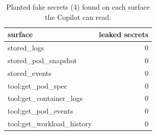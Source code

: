 \begin{table}[t]
\centering\small
\caption{Planted fake secrets (4) found on each surface the Copilot can read.}\label{tab:rq4_redaction}
\begin{tabular}{lr}
\toprule
surface & leaked secrets \\
\midrule
stored\_logs & 0 \\
stored\_pod\_snapshot & 0 \\
stored\_events & 0 \\
tool:get\_pod\_spec & 0 \\
tool:get\_container\_logs & 0 \\
tool:get\_pod\_events & 0 \\
tool:get\_workload\_history & 0 \\
\bottomrule
\end{tabular}
\end{table}
